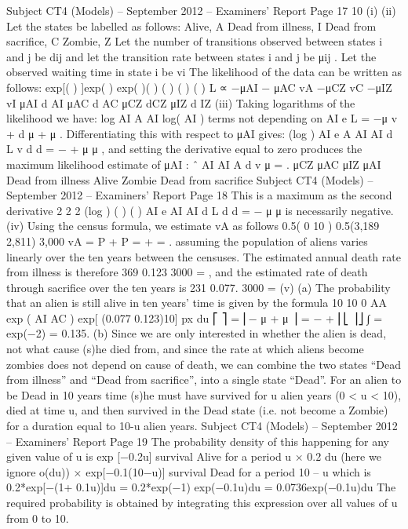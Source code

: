 \documentclass[a4paper,12pt]{article}
\begin{document}
Subject CT4 (Models) – September 2012 – Examiners’ Report
Page 17
10
(i)
(ii) Let the states be labelled as follows:
Alive, A
Dead from illness, I
Dead from sacrifice, C
Zombie, Z
Let the number of transitions observed between states i and j be dij
and let the transition rate between states i and j be μij .
Let the observed waiting time in state i be vi
The likelihood of the data can be written as follows:
exp[( ) ]exp( ) exp( )( ) ( ) ( ) ( ) L ∝ −μAI − μAC vA −μCZ vC −μIZ vI μAI d AI μAC d AC μCZ dCZ μIZ d IZ
(iii) Taking logarithms of the likelihood we have:
log AI A AI log( AI ) terms not depending on AI
e L = −μ v + d μ + μ .
Differentiating this with respect to μAI gives:
(log ) AI
e A
AI AI
d L v d
d
= − +
μ μ
,
and setting the derivative equal to zero produces the maximum likelihood estimate of
μAI :
ˆ
AI
AI
A
d
v
μ = .
μCZ
μAC μIZ
μAI
Dead from illness
Alive
Zombie
Dead from sacrifice
Subject CT4 (Models) – September 2012 – Examiners’ Report
Page 18
This is a maximum as the second derivative
2
2 2
(log )
( ) ( )
AI
e
AI AI
d L d
d
= −
μ μ
is necessarily negative.
(iv) Using the census formula, we estimate vA as follows
0.5( 0 10 ) 0.5(3,189 2,811) 3,000 vA = P + P = + = .
assuming the population of aliens varies linearly over the ten years between the
censuses.
The estimated annual death rate from illness is therefore
369 0.123
3000
= ,
and the estimated rate of death through sacrifice over the ten years is
231 0.077.
3000
=
(v) (a) The probability that an alien is still alive in ten years’ time
is given by the formula
10
10
0
AA exp ( AI AC ) exp[ (0.077 0.123)10]
px du
⎡ ⎤
= ⎢− μ + μ ⎥ = − +
⎢⎣ ⎥⎦
∫
= exp(−2) = 0.135.
(b) Since we are only interested in whether the alien is dead, not what cause (s)he
died from,
and since the rate at which aliens become zombies does not depend on cause
of death, we can combine the two states “Dead from illness” and “Dead from
sacrifice”, into a single state “Dead”.
For an alien to be Dead in 10 years time (s)he must have survived for u
alien years (0 < u < 10), died at time u, and then survived in the Dead state (i.e.
not become a Zombie) for a duration equal to 10-u alien years.
Subject CT4 (Models) – September 2012 – Examiners’ Report
Page 19
The probability density of this happening for any given value of u is
exp [−0.2u] survival Alive for a period u
×
0.2 du (here we ignore o(du))
×
exp[−0.1(10−u)] survival Dead for a period 10 – u
which is
0.2*exp[−(1+ 0.1u)]du = 0.2*exp(−1) exp(−0.1u)du
= 0.0736exp(−0.1u)du
The required probability is obtained by integrating this expression over
all values of u from 0 to 10.
\end{document}
